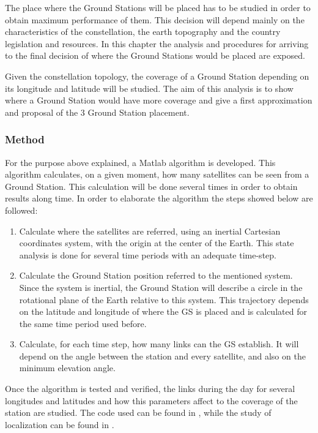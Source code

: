 The place where the Ground Stations will be placed has to be studied in order to obtain maximum performance of them. This decision will depend mainly on the characteristics of the constellation, the earth topography and the country legislation and resources. In this chapter the analysis and procedures for arriving to the final decision of where the Ground Stations would be placed are exposed.

Given the constellation topology, the coverage of a Ground Station depending on its longitude and latitude will be studied. The aim of this analysis is to show where a Ground Station would have more coverage and give a first approximation and proposal of the 3 Ground Station placement.

\subsubsection{Method}
For the purpose above explained, a Matlab algorithm is developed. This algorithm calculates, on a given moment, how many satellites can be seen from a Ground Station. This calculation will be done several times in order to obtain results along time. In order to elaborate the algorithm the steps showed below are followed:
\begin{enumerate}
\item Calculate where the satellites are referred, using an inertial Cartesian coordinates system, with the origin at the center of the Earth. This state analysis is done for several time periods with an adequate time-step. 
\item Calculate the Ground Station position referred to the mentioned system. Since the system is inertial, the Ground Station will describe a circle in the rotational plane of the Earth relative to this system. This trajectory depends on the latitude and longitude of where the GS is placed and is calculated for the same time period used before.
\item Calculate, for each time step, how many links can the GS establish. It will depend on the angle between the station and every satellite, and also on the minimum elevation angle. 
\end{enumerate}

Once the algorithm is tested and verified, the links during the day for several longitudes and latitudes and how this parameters affect to the coverage of the station are studied. The code used can be found in \cite[Chapter 1, Section 12]{annex6}, while the study of localization can be found in \cite[Chapter 3, Section 1]{annex3}.

